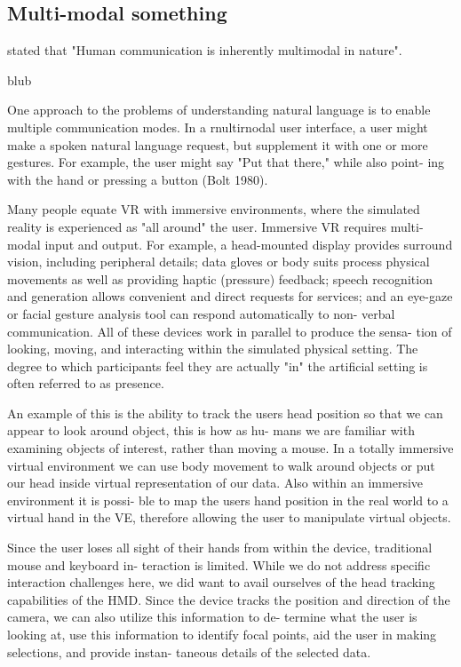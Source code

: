 \subsection{Multi-modal  something}

\cite{Bunt1998} stated that "Human communication is inherently multimodal in nature".

blub


One approach to the problems of understanding natural language is to enable multiple communication modes. In a rnultirnodal user interface, a user might make a spoken natural language request, but supplement it with one or more gestures. For example, the user might say "Put that there," while also point- ing with the hand or pressing a button (Bolt 1980).  \cite{Rosson2002}



Many people equate VR with immersive environments, where the simulated reality is experienced as "all around" the user. Immersive VR requires multi- modal input and output. For example, a head-mounted display provides surround vision, including peripheral details; data gloves or body suits process physical movements as well as providing haptic (pressure) feedback; speech recognition and generation allows convenient and direct requests for services; and an eye-gaze or facial gesture analysis tool can respond automatically to non- verbal communication. All of these devices work in parallel to produce the sensa- tion of looking, moving, and interacting within the simulated physical setting. The degree to which participants feel they are actually "in" the artificial setting is often referred to as presence. \cite{Rosson2002}




An example of this is the ability to track the users head position so that we can appear to look around object, this is how as hu- mans we are familiar with examining objects of interest, rather than moving a mouse. In a totally immersive virtual environment we can use body movement to walk around objects or put our head inside virtual representation of our data. Also within an immersive environment it is possi- ble to map the users hand position in the real world to a virtual hand in the VE, therefore allowing the user to manipulate virtual objects. \cite{Jamieson2007}


Since the user loses all sight of their hands from within the device, traditional mouse and keyboard in- teraction is limited. While we do not address specific interaction challenges here, we did want to avail ourselves of the head tracking capabilities of the HMD. Since the device tracks the position and direction of the camera, we can also utilize this information to de- termine what the user is looking at, use this information to identify focal points, aid the user in making selections, and provide instan- taneous details of the selected data. \cite{Kwon2015}

